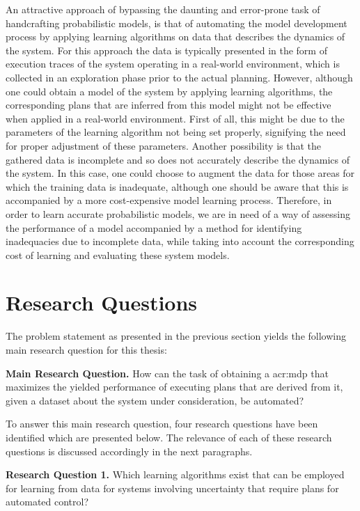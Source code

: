 An attractive approach of bypassing the daunting and error-prone task of handcrafting probabilistic models, is that of automating the model development process by applying learning algorithms on data that describes the dynamics of the system.
For this approach the data is typically presented in the form of execution traces of the system operating in a real-world environment, which is collected in an exploration phase prior to the actual planning.
However, although one could obtain a model of the system by applying learning algorithms, the corresponding plans that are inferred from this model might not be effective when applied in a real-world environment.
First of all, this might be due to the parameters of the learning algorithm not being set properly, signifying the need for proper adjustment of these parameters.
Another possibility is that the gathered data is incomplete and so does not accurately describe the dynamics of the system.
In this case, one could choose to augment the data for those areas for which the training data is inadequate, although one should be aware that this is accompanied by a more cost-expensive model learning process.
Therefore, in order to learn accurate probabilistic models, we are in need of a way of assessing the performance of a model accompanied by a method for identifying inadequacies due to incomplete data, while taking into account the corresponding cost of learning and evaluating these system models.

\section{Research Questions}
\label{sec:research-questions}
The problem statement as presented in the previous section yields the following main research question for this thesis:

\vspace{12pt}
\noindent%
\textbf{Main Research Question.} How can the task of obtaining a \acrfull{acr:mdp} that maximizes the yielded performance of executing plans that are derived from it, given a dataset about the system under consideration, be automated?
\vspace{12pt}

To answer this main research question, four research questions have been identified which are presented below.
The relevance of each of these research questions is discussed accordingly in the next paragraphs.

\vspace{16pt}
\noindent%
\textbf{Research Question 1.} Which learning algorithms exist that can be employed for learning  from data for systems involving uncertainty that require plans for automated control?
\vspace{0pt}


